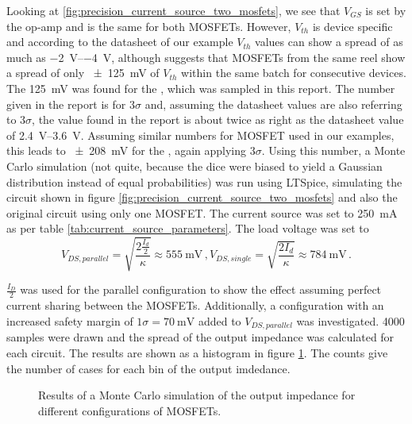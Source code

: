 Looking at \ref{fig:precision_current_source_two_mosfets}, we see that $V_{GS}$ is set by the op-amp and is the same for both MOSFETs. However, $V_{th}$ is device specific and according to the datasheet of our example  \cite{datasheet_IRF9610} $V_{th}$ values can show a spread of as much as \qtyrange[range-units = single, range-phrase={~to~}]{-2}{-4}{\V}, although \cite{appnote_mosfet_parameter_spread} suggests that MOSFETs from the same reel show a spread of only \qty{\pm 125}{\mV} of $V_{th}$  within the same batch for consecutive devices. The \qty{125}{\mV} was found for the  \cite{datasheet_BUK7S1R5}, which was sampled in this report. The number given in the report is for $3\sigma$ and, assuming the datasheet values are also referring to $3\sigma$, the value found in the report is about twice as right as the datasheet value of \qtyrange[range-units = single]{2.4}{3.6}{\V}. Assuming similar numbers for  MOSFET used in our examples, this leads to \qty{\pm 208}{\mV} for the , again applying $3\sigma$. Using this number, a Monte Carlo simulation (not quite, because the dice were biased to yield a Gaussian distribution instead of equal probabilities) was run using LTSpice, simulating the circuit shown in figure \ref{fig:precision_current_source_two_mosfets} and also the original circuit using only one MOSFET. The current source was set to \qty{250}{\mA} as per table \ref{tab:current_source_parameters}. The load voltage was set to
\begin{equation*}
    V_{DS, parallel} = \sqrt{\frac{2 \frac{I_d}{2}}{\kappa}} \approx \qty{555}{\mV}\,,
    V_{DS, single} = \sqrt{\frac{2 I_d}{\kappa}} \approx \qty{784}{\mV} \,.
\end{equation*}

$\frac{I_D}{2}$ was used for the parallel configuration to show the effect assuming perfect current sharing between the MOSFETs. Additionally, a configuration with an increased safety margin of $1 \sigma = \qty{70}{\mV}$ added to $V_{DS, parallel}$ was investigated. \num{4000} samples were drawn and the spread of the output impedance was calculated for each circuit. The results are shown as a histogram in figure \ref{fig:ltpsice_mosfet_mc_output_impedance}. The counts give the number of cases for each bin of the output imdedance.

\begin{figure}[ht]
    \centering
    
    \caption{Results of a Monte Carlo simulation of the output impedance for different configurations of MOSFETs.}
    \label{fig:ltpsice_mosfet_mc_output_impedance}
\end{figure}

